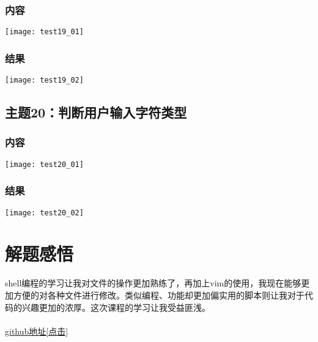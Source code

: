 \documentclass{article}
\begin{document}
\subsubsection{内容}
\texttt{[image: test19\_01]}\\
\subsubsection{结果}  
\texttt{[image: test19\_02]}\\
\vspace{1cm}
\subsection{主题20：判断用户输入字符类型}  
\subsubsection{内容}
\texttt{[image: test20\_01]}\\
\subsubsection{结果} 
\texttt{[image: test20\_02]}\\ 
\newpage
\thispagestyle{empty}
\section{解题感悟}  
  shell编程的学习让我对文件的操作更加熟练了，再加上vim的使用，我现在能够更加方便的对各种文件进行修改。类似编程、功能却更加偏实用的脚本则让我对于代码的兴趣更加的浓厚。这次课程的学习让我受益匪浅。\\\\
\href{https://github.com/coff-sug/system_development.git}{github地址[点击]}
\end{document}
